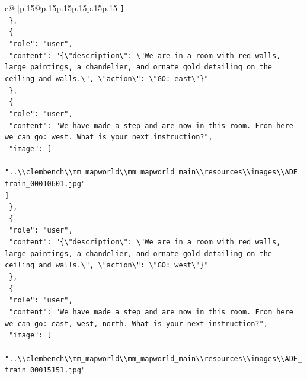 \documentclass{article}
\begin{document}
{\begin{supertabular}{c@{$\;$}|p{.15\linewidth}@{}p{.15\linewidth}p{.15\linewidth}p{.15\linewidth}p{.15\linewidth}p{.15\linewidth}}
{{{\texttt{    {]}} \\
\texttt{  \},} \\
\texttt{  \{} \\
\texttt{    "role": "user",} \\
\texttt{    "content": "\{\textbackslash{}"description\textbackslash{}": \textbackslash{}"We are in a room with red walls, large paintings, a chandelier, and ornate gold detailing on the ceiling and walls.\textbackslash{}", \textbackslash{}"action\textbackslash{}": \textbackslash{}"GO: east\textbackslash{}"\}"} \\
\texttt{  \},} \\
\texttt{  \{} \\
\texttt{    "role": "user",} \\
\texttt{    "content": "We have made a step and are now in this room. From here we can go: west. What is your next instruction?",} \\
\texttt{    "image": {[}} \\
\texttt{      "..\textbackslash{}\textbackslash{}clembench\textbackslash{}\textbackslash{}mm\_mapworld\textbackslash{}\textbackslash{}mm\_mapworld\_main\textbackslash{}\textbackslash{}resources\textbackslash{}\textbackslash{}images\textbackslash{}\textbackslash{}ADE\_train\_00010601.jpg"} \\
\texttt{    {]}} \\
\texttt{  \},} \\
\texttt{  \{} \\
\texttt{    "role": "user",} \\
\texttt{    "content": "\{\textbackslash{}"description\textbackslash{}": \textbackslash{}"We are in a room with red walls, large paintings, a chandelier, and ornate gold detailing on the ceiling and walls.\textbackslash{}", \textbackslash{}"action\textbackslash{}": \textbackslash{}"GO: west\textbackslash{}"\}"} \\
\texttt{  \},} \\
\texttt{  \{} \\
\texttt{    "role": "user",} \\
\texttt{    "content": "We have made a step and are now in this room. From here we can go: east, west, north. What is your next instruction?",} \\
\texttt{    "image": {[}} \\
\texttt{      "..\textbackslash{}\textbackslash{}clembench\textbackslash{}\textbackslash{}mm\_mapworld\textbackslash{}\textbackslash{}mm\_mapworld\_main\textbackslash{}\textbackslash{}resources\textbackslash{}\textbackslash{}images\textbackslash{}\textbackslash{}ADE\_train\_00015151.jpg"} \\
}}}
\end{supertabular}}
\end{document}
